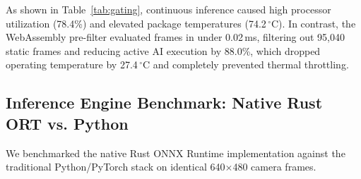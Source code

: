 \documentclass[conference]{IEEEtran}
\begin{document}
    \begin{table}[htbp]
    \caption{System Performance: Continuous Inference vs. Tiered Gating}
    \label{tab:gating}
    \centering
    \end{table}
    
    As shown in Table~\ref{tab:gating}, continuous inference caused high processor utilization (78.4\%) and elevated package temperatures (74.2\,$^{\circ}$C). In
    contrast, the WebAssembly pre-filter evaluated frames in under 0.02\,ms, filtering out 95,040 static frames and reducing active AI execution by 88.0\%, which
    dropped operating temperature by 27.4\,$^{\circ}$C and completely prevented thermal throttling.
    
    \subsection{Inference Engine Benchmark: Native Rust ORT vs. Python}
    We benchmarked the native Rust ONNX Runtime implementation against the traditional Python/PyTorch stack on identical 640$\times$480 camera frames.
    
\end{document}
